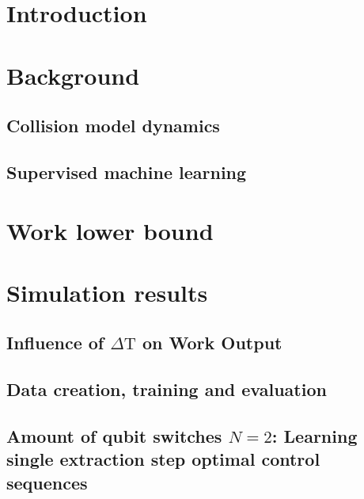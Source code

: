  
\tableofcontents



\mainmatter

\chapter{Introduction}


\chapter{Background} \label{background}
\section{Collision model dynamics} \label{col_model}


%
\section{Supervised machine learning} \label{sml}


\chapter{Work lower bound} \label{lower_bound}


\chapter{Simulation results}
\section{Influence of $\Delta \mathrm{T}$ on Work Output} \label{dep_dt}

\section{Data creation, training and evaluation}

\section{Amount of qubit switches $N=2$: Learning single extraction step optimal control sequences} \label{n_2_ml}

